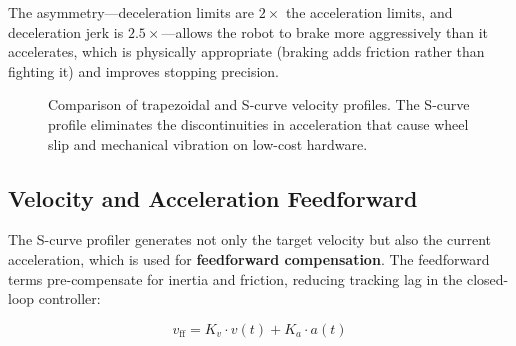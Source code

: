 \documentclass[12pt, a4paper, twoside]{article}
\begin{document}
\noindent The asymmetry---deceleration limits are $2\times$ the acceleration limits, and deceleration jerk is $2.5\times$---allows the robot to brake more aggressively than it accelerates, which is physically appropriate (braking adds friction rather than fighting it) and improves stopping precision.

\begin{figure}[H]
    \centering
    \caption{Comparison of trapezoidal and S-curve velocity profiles. The S-curve profile eliminates the discontinuities in acceleration that cause wheel slip and mechanical vibration on low-cost hardware.}
    \label{fig:scurve}
\end{figure}

\subsection{Velocity and Acceleration Feedforward}

The S-curve profiler generates not only the target velocity but also the current acceleration, which is used for \textbf{feedforward compensation}. The feedforward terms pre-compensate for inertia and friction, reducing tracking lag in the closed-loop controller:

\begin{equation}
    v_{\text{ff}} = K_v \cdot v(t) + K_a \cdot a(t)
\end{equation}
\end{document}
